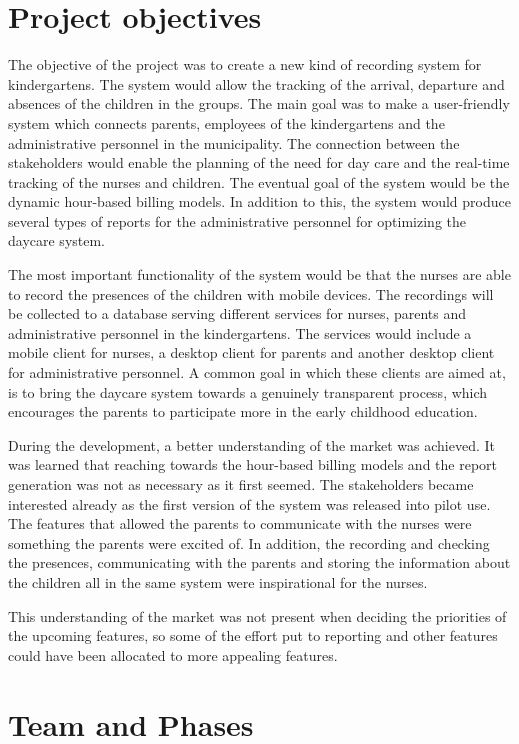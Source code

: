 
 \section{Project objectives}

The objective of the project was to create a new kind of recording system for kindergartens. The system would allow the tracking of the arrival, departure and absences of the children in the groups. The main goal was to make a user-friendly system which connects parents, employees of the kindergartens and the administrative personnel in the municipality. The connection between the stakeholders would enable the planning of the need for day care and the real-time tracking of the nurses and children. The eventual goal of the system would be the dynamic hour-based billing models. In addition to this, the system would produce several types of reports for the administrative personnel for optimizing the daycare system.

The most important functionality of the system would be that the nurses are able to record the presences of the children with mobile devices. The recordings will be collected to a database serving different services for nurses, parents and administrative personnel in the kindergartens. The services would include a mobile client for nurses, a desktop client for parents and another desktop client for administrative personnel. A common goal in which these clients are aimed at, is to bring the daycare system towards a genuinely transparent process, which encourages the parents to participate more in the early childhood education.

During the development, a better understanding of the market was achieved. It was learned that reaching towards the hour-based billing models and the report generation was not as necessary as it first seemed. The stakeholders became interested already as the first version of the system was released into pilot use. The features that allowed the parents to communicate with the nurses were something the parents were excited of. In addition, the recording and checking the presences, communicating with the parents and storing the information about the children all in the same system were inspirational for the nurses.

This understanding of the market was not present when deciding the priorities of the upcoming features, so some of the effort put to reporting and other features could have been allocated to more appealing features.

 \section{Team and Phases}

